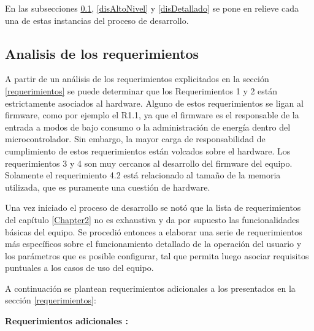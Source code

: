En las subsecciones \ref{analisisReq}, \ref{disAltoNivel} y \ref{disDetallado} se pone en relieve cada una de estas instancias del proceso de desarrollo.

\subsection{Analisis de los requerimientos} \label{analisisReq}

A partir de un análisis de los requerimientos explicitados en la sección \ref{requerimientos} se puede determinar que los Requerimientos 1 y 2 están estrictamente asociados al hardware. Alguno de estos requerimientos se ligan al firmware, como por ejemplo el R1.1, ya que el firmware es el responsable de la entrada a modos de bajo consumo o la administración de energía dentro del microcontrolador. Sin embargo, la mayor carga de responsabilidad de cumplimiento de estos requerimientos están volcados sobre el hardware. Los requerimientos 3 y 4 son muy cercanos al desarrollo del firmware del equipo. Solamente el requerimiento 4.2 está relacionado al tamaño de la memoria utilizada, que es puramente una cuestión de hardware.

Una vez iniciado el proceso de desarrollo se notó que la lista de requerimientos del capítulo \ref{Chapter2} no es exhaustiva y da por supuesto las funcionalidades básicas del equipo. Se procedió entonces a elaborar una serie de requerimientos más específicos sobre el funcionamiento detallado de la operación del usuario y los parámetros que es posible configurar, tal que permita luego asociar requisitos puntuales a los casos de uso del equipo. 

A continuación se plantean requerimientos adicionales a los presentados en la sección \ref{requerimientos}:

\textbf{Requerimientos adicionales :}

